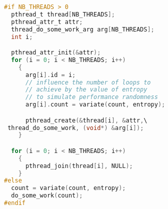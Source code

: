 \begin{lstlisting}[caption={If the constant {NB\_THREAD} is defined to a value greater than zero when compiling this code, then a multi-threaded version of the code is compiled, using pthreads. Otherwise the sequential version is generated, that simply calls the function achieving the computation.},label={lst:directive},language=C]
#if NB_THREADS > 0
  pthread_t thread[NB_THREADS];
  pthread_attr_t attr;
  thread_do_some_work_arg arg[NB_THREADS];
  int i;

  pthread_attr_init(&attr);
  for (i = 0; i < NB_THREADS; i++)
    {
      arg[i].id = i;
      // influence the number of loops to
      // achieve by the value of entropy
      // to simulate performance randomness
      arg[i].count = variate(count, entropy);

      pthread_create(&thread[i], &attr,\
 thread_do_some_work, (void*) &arg[i]);
    }

  for (i = 0; i < NB_THREADS; i++)
    {
      pthread_join(thread[i], NULL);
    }
#else
  count = variate(count, entropy);
  do_some_work(count);
#endif
\end{lstlisting}


